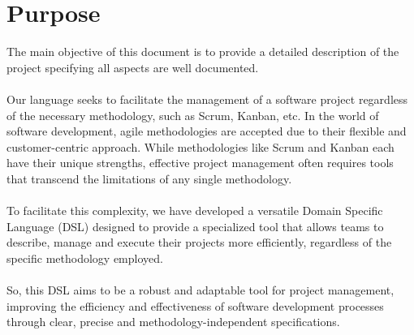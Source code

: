 \section{Purpose}
\label{sec:purpose}
The main objective of this document is to provide a detailed description of the project specifying all aspects are well documented.
\\\\
Our language seeks to facilitate the management of a software project regardless of the necessary methodology, such as Scrum, Kanban, etc. In the world of software development, agile methodologies are accepted due to their flexible and customer-centric approach. While methodologies like Scrum and Kanban each have their unique strengths, effective project management often requires tools that transcend the limitations of any single methodology.
\\\\
To facilitate this complexity, we have developed a versatile Domain Specific Language (DSL) designed to provide a specialized tool that allows teams to describe, manage and execute their projects more efficiently, regardless of the specific methodology employed. 
\\\\
So, this DSL aims to be a robust and adaptable tool for project management, improving the efficiency and effectiveness of software development processes through clear, precise and methodology-independent specifications.
